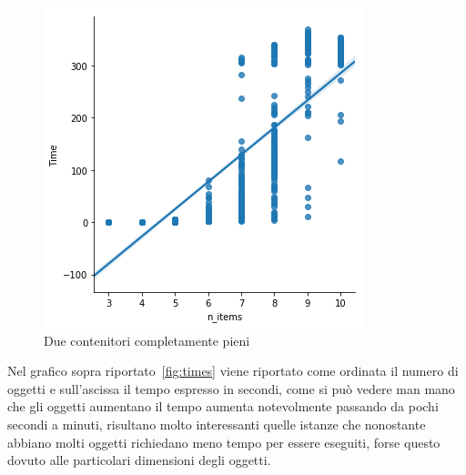 \begin{figure}[!ht]
	\begin{center} \includegraphics[scale=0.8]{figures/time_nitems}
		\caption[Bin packing figures]{Due contenitori completamente pieni}  
		\label{fig:times}
	\end{center}
\end{figure}

Nel grafico sopra riportato~\eqref{fig:times} viene riportato come ordinata il numero di oggetti e sull'ascissa il tempo espresso in secondi, come si può vedere man mano che gli oggetti aumentano il tempo aumenta notevolmente passando da pochi secondi a minuti, risultano molto interessanti quelle istanze che nonostante abbiano molti oggetti richiedano meno tempo per essere eseguiti, forse questo dovuto alle particolari dimensioni degli oggetti.

